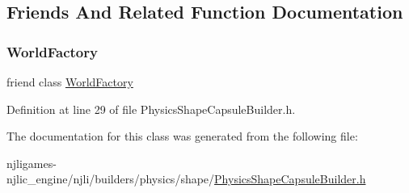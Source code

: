 \subsection{Friends And Related Function Documentation}
\mbox{\label{classnjli_1_1_physics_shape_capsule_builder_acb96ebb09abe8f2a37a915a842babfac}} 
\subsubsection{\texorpdfstring{World\+Factory}{WorldFactory}}
{\footnotesize\ttfamily friend class \mbox{\hyperlink{classnjli_1_1_world_factory}{World\+Factory}}\hspace{0.3cm}{\ttfamily [friend]}}



Definition at line 29 of file Physics\+Shape\+Capsule\+Builder.\+h.



The documentation for this class was generated from the following file\+:\begin{DoxyCompactItemize}
\item 
njligames-\/njlic\+\_\+engine/njli/builders/physics/shape/\mbox{\hyperlink{_physics_shape_capsule_builder_8h}{Physics\+Shape\+Capsule\+Builder.\+h}}\end{DoxyCompactItemize}
